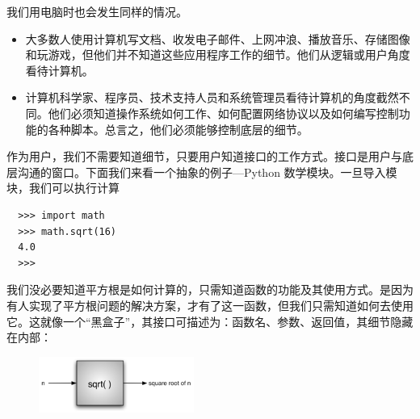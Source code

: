 \begin{frame}\ft{\secname}
  我们用电脑时也会发生同样的情况。
  \begin{itemize}
  \item 大多数人使用计算机写文档、收发电子邮件、上网冲浪、播放音乐、存储图像和玩游戏，但他们并不知道这些应用程序工作的细节。他们从逻辑或用户角度看待计算机。
  \item 计算机科学家、程序员、技术支持人员和系统管理员看待计算机的角度截然不同。他们必须知道操作系统如何工作、如何配置网络协议以及如何编写控制功能的各种脚本。总言之，他们必须能够控制底层的细节。

  \end{itemize}

\end{frame}

\begin{frame}[fragile]\ft{\secname}

作为用户，我们不需要知道细节，只要用户知道接口的工作方式。接口是用户与底层沟通的窗口。下面我们来看一个抽象的例子---Python 数学模块。一旦导入模块，我们可以执行计算
\begin{lstlisting}
  >>> import math
  >>> math.sqrt(16)
  4.0
  >>>
\end{lstlisting}

我们没必要知道平方根是如何计算的，只需知道函数的功能及其使用方式。是因为有人实现了平方根问题的解决方案，才有了这一函数，但我们只需知道如何去使用它。这就像一个“黑盒子”，其接口可描述为：函数名、参数、返回值，其细节隐藏在内部：
\begin{figure}[htbp]
  \centering
  \includegraphics[width=2in]{images/blackbox.png}
\end{figure}

\end{frame}

